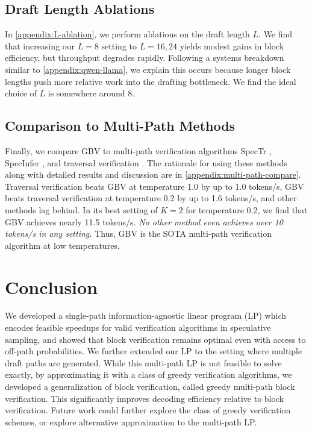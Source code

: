 \documentclass{article}
\theoremstyle{plain}
\theoremstyle{definition}
\theoremstyle{remark}
\begin{document}
\subsection{Draft Length Ablations}
\label{subsec:draft}

In \cref{appendix:L-ablation}, we perform ablations on the draft length $L$. We find that increasing our $L=8$ setting to $L=16,24$ yields modest gains in block efficiency, but throughput degrades rapidly. Following a systems breakdown similar to \cref{appendix:qwen-llama}, we explain this occurs because longer  block lengths push more relative work into the drafting bottleneck. We find the ideal choice of $L$ is somewhere around $8$. 

\subsection{Comparison to Multi-Path Methods}
\label{subsec:multipath}

    Finally, we compare GBV to multi-path verification algorithms SpecTr \citep{sun2023spectr}, SpecInfer \citep{miao2024specinfer}, and traversal verification \citep{weng2025traversal}. The rationale for using these methods along with detailed results and discussion are in \cref{appendix:multi-path-compare}. Traversal verification beats GBV at temperature 1.0 by up to 1.0 tokens/s, GBV beats traversal verification at temperature 0.2 by up to 1.6 tokens/s, and other methods lag behind. In its best setting of $K=2$ for temperature 0.2, we find that GBV achieves nearly 11.5 tokens/s. \textit{No other method even achieves over 10 tokens/s in any setting.} Thus, GBV is the SOTA multi-path verification algorithm at low temperatures.

\section{Conclusion}

We developed a single-path information-agnostic linear program (LP) which encodes feasible speedups for valid verification algorithms in speculative sampling, and showed that block verification remains optimal even with access to off-path probabilities. We further extended our LP to the setting where multiple draft paths are generated. While this multi-path LP is not feasible to solve exactly, by approximating it with a class of greedy verification algorithms, we developed a generalization of block verification, called greedy multi-path block verification. This significantly improves decoding efficiency relative to block verification. Future work could further explore the class of greedy verification schemes, or explore alternative approximation to the multi-path LP.
\end{document}
